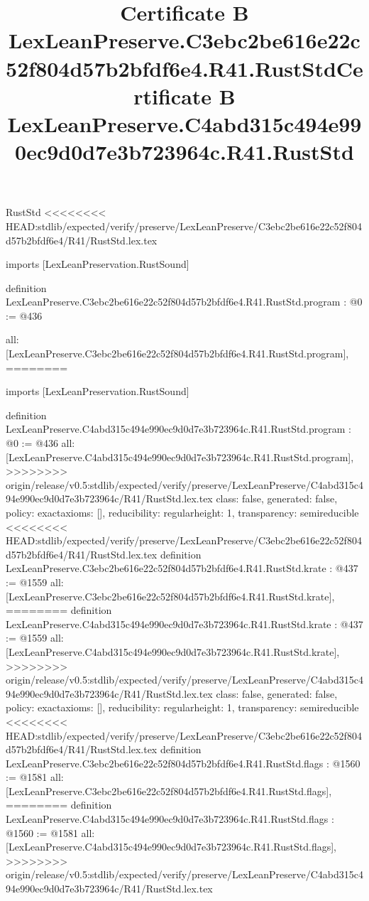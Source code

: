 \begin{lexlean}{RustStd}
<<<<<<<< HEAD:stdlib/expected/verify/preserve/LexLeanPreserve/C3ebc2be616e22c52f804d57b2bfdf6e4/R41/RustStd.lex.tex
\title{Certificate B LexLeanPreserve.C3ebc2be616e22c52f804d57b2bfdf6e4.R41.RustStd}
\begin{coremodule}
imports [LexLeanPreservation.RustSound]

definition LexLeanPreserve.C3ebc2be616e22c52f804d57b2bfdf6e4.R41.RustStd.program : @0 := @436 {
  all: [LexLeanPreserve.C3ebc2be616e22c52f804d57b2bfdf6e4.R41.RustStd.program],
========
\title{Certificate B LexLeanPreserve.C4abd315c494e990ec9d0d7e3b723964c.R41.RustStd}
\begin{coremodule}
imports [LexLeanPreservation.RustSound]

definition LexLeanPreserve.C4abd315c494e990ec9d0d7e3b723964c.R41.RustStd.program : @0 := @436 {
  all: [LexLeanPreserve.C4abd315c494e990ec9d0d7e3b723964c.R41.RustStd.program],
>>>>>>>> origin/release/v0.5:stdlib/expected/verify/preserve/LexLeanPreserve/C4abd315c494e990ec9d0d7e3b723964c/R41/RustStd.lex.tex
  class: false,
  generated: false,
  policy: exact{axioms: []},
  reducibility: regular{height: 1},
  transparency: semireducible
}
<<<<<<<< HEAD:stdlib/expected/verify/preserve/LexLeanPreserve/C3ebc2be616e22c52f804d57b2bfdf6e4/R41/RustStd.lex.tex
definition LexLeanPreserve.C3ebc2be616e22c52f804d57b2bfdf6e4.R41.RustStd.krate : @437 := @1559 {
  all: [LexLeanPreserve.C3ebc2be616e22c52f804d57b2bfdf6e4.R41.RustStd.krate],
========
definition LexLeanPreserve.C4abd315c494e990ec9d0d7e3b723964c.R41.RustStd.krate : @437 := @1559 {
  all: [LexLeanPreserve.C4abd315c494e990ec9d0d7e3b723964c.R41.RustStd.krate],
>>>>>>>> origin/release/v0.5:stdlib/expected/verify/preserve/LexLeanPreserve/C4abd315c494e990ec9d0d7e3b723964c/R41/RustStd.lex.tex
  class: false,
  generated: false,
  policy: exact{axioms: []},
  reducibility: regular{height: 1},
  transparency: semireducible
}
<<<<<<<< HEAD:stdlib/expected/verify/preserve/LexLeanPreserve/C3ebc2be616e22c52f804d57b2bfdf6e4/R41/RustStd.lex.tex
definition LexLeanPreserve.C3ebc2be616e22c52f804d57b2bfdf6e4.R41.RustStd.flags : @1560 := @1581 {
  all: [LexLeanPreserve.C3ebc2be616e22c52f804d57b2bfdf6e4.R41.RustStd.flags],
========
definition LexLeanPreserve.C4abd315c494e990ec9d0d7e3b723964c.R41.RustStd.flags : @1560 := @1581 {
  all: [LexLeanPreserve.C4abd315c494e990ec9d0d7e3b723964c.R41.RustStd.flags],
>>>>>>>> origin/release/v0.5:stdlib/expected/verify/preserve/LexLeanPreserve/C4abd315c494e990ec9d0d7e3b723964c/R41/RustStd.lex.tex
}}}
\end{coremodule}}
\end{coremodule}
\end{lexlean}
